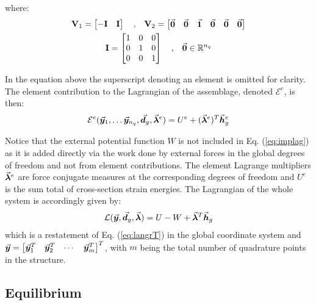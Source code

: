 \noindent where:
\begin{gather}
	\mathbf{V}_1 = \begin{bmatrix}
		-\mathbf{I} & \mathbf{I}
	\end{bmatrix}\quad\text{,}\quad
	\mathbf{V}_2 = \begin{bmatrix}
		\vec{\bm{0}} & \vec{\bm{0}} & \vec{\bm{1}} & \vec{\bm{0}} & \vec{\bm{0}} & \vec{\bm{0}}
	\end{bmatrix}\nonumber\\
	\mathbf{I} = \begin{bmatrix}
		1 & 0 & 0\\
		0 & 1 & 0\\
		0 & 0 & 1
	\end{bmatrix}\quad\text{,}\quad 
	\vec{\bm{0}}\in\mathbb{R}^{n_q}\nonumber
\end{gather}

\noindent In the equation above the superscript denoting an element is omitted
for clarity. The element contribution to the Lagrangian of the assemblage,
denoted $\mathcal{E}^e$, is then:
\begin{gather}
	\mathcal{E}^e(\vec{\bm{y}}_1,\dots \vec{\bm{y}}_{n_q}, 
	\vec{\bm{d}}_g,\vec{\bm{\lambda}}^e) =
	U^e  + (\vec{\bm{\lambda}}^e)^T\vec{\bm{h}}^e_g
	\label{eq:implag}
\end{gather}

\noindent Notice that the external potential function $W$ is not included
in Eq. (\ref{eq:implag}) as it is added directly via the work done by external
forces in the global degrees of freedom and not from element contributions.
The element Lagrange multipliers $\vec{\bm{\lambda}}^e$ are force
conjugate measures at the corresponding degrees of freedom and $U^e$ is the
sum total of cross-section strain energies.
The Lagrangian of the whole system is accordingly given by:
\begin{gather}
	\mathcal{L}(\vec{\bm{y}}, \vec{\bm{d}}_g,\vec{\bm{\lambda}}) =
	U-W+\vec{\bm{\lambda}}^T\vec{\bm{h}}_g
\end{gather}
\noindent which is a restatement of Eq. (\ref{eq:langrT}) in the global 
coordinate
system and $\vec{\bm{y}} = \begin{bmatrix}
	\vec{\bm{y}}_1^T & \vec{\bm{y}}_2^T & \cdots & \vec{\bm{y}}_m^T
\end{bmatrix}^T$, with $m$ being the total number of quadrature points in
the structure.

\subsection{Equilibrium}\label{subsection:CH2-S4SS1}

